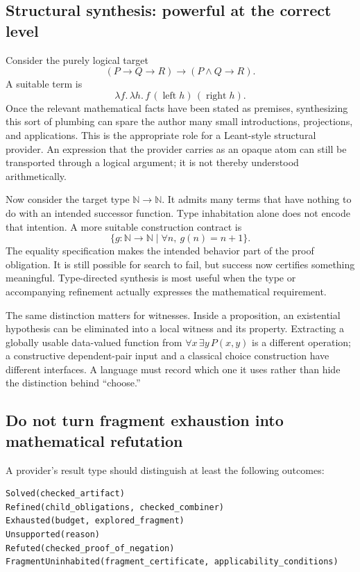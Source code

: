 \documentclass[11pt,a4paper]{article}
\newcommand{\N}{\mathbb N}
\theoremstyle{definition}
\theoremstyle{remark}
\begin{document}
\subsection{Structural synthesis: powerful at the correct level}
Consider the purely logical target
\[
 (P\to Q\to R)\to(P\land Q\to R).
\]
A suitable term is
\[
 \lambda f.\,\lambda h.\,f\,(\operatorname{left}h)\,
                         (\operatorname{right}h).
\]
Once the relevant mathematical facts have been stated as premises, synthesizing this sort of plumbing can spare the author many small introductions, projections, and applications. This is the appropriate role for a Leant-style structural provider. An expression that the provider carries as an opaque atom can still be transported through a logical argument; it is not thereby understood arithmetically.

Now consider the target type $\N\to\N$. It admits many terms that have nothing to do with an intended successor function. Type inhabitation alone does not encode that intention. A more suitable construction contract is
\[
 \{g:\N\to\N\mid \forall n,\ g(n)=n+1\}.
\]
The equality specification makes the intended behavior part of the proof obligation. It is still possible for search to fail, but success now certifies something meaningful. Type-directed synthesis is most useful when the type or accompanying refinement actually expresses the mathematical requirement.

The same distinction matters for witnesses. Inside a proposition, an existential hypothesis can be eliminated into a local witness and its property. Extracting a globally usable data-valued function from $\forall x\,\exists y\,P(x,y)$ is a different operation; a constructive dependent-pair input and a classical choice construction have different interfaces. A language must record which one it uses rather than hide the distinction behind ``choose.''

\subsection{Do not turn fragment exhaustion into mathematical refutation}
A provider's result type should distinguish at least the following outcomes:
\begin{lstlisting}
Solved(checked_artifact)
Refined(child_obligations, checked_combiner)
Exhausted(budget, explored_fragment)
Unsupported(reason)
Refuted(checked_proof_of_negation)
FragmentUninhabited(fragment_certificate, applicability_conditions)
\end{lstlisting}
\end{document}
